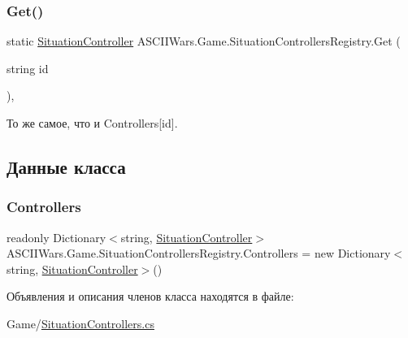 \subsubsection{\texorpdfstring{Get()}{Get()}}
{\footnotesize\ttfamily static \hyperlink{interface_a_s_c_i_i_wars_1_1_game_1_1_situation_controller}{Situation\+Controller} A\+S\+C\+I\+I\+Wars.\+Game.\+Situation\+Controllers\+Registry.\+Get (\begin{DoxyParamCaption}\item[{string}]{id }\end{DoxyParamCaption})\hspace{0.3cm}{\ttfamily [inline]}, {\ttfamily [static]}}



То же самое, что и {\ttfamily Controllers\mbox{[}id\mbox{]}}. 



\subsection{Данные класса}
\hypertarget{class_a_s_c_i_i_wars_1_1_game_1_1_situation_controllers_registry_a1fbefd2e6e4140f5d703ffb7367fee20}{}\label{class_a_s_c_i_i_wars_1_1_game_1_1_situation_controllers_registry_a1fbefd2e6e4140f5d703ffb7367fee20} 
\subsubsection{\texorpdfstring{Controllers}{Controllers}}
{\footnotesize\ttfamily readonly Dictionary$<$string, \hyperlink{interface_a_s_c_i_i_wars_1_1_game_1_1_situation_controller}{Situation\+Controller}$>$ A\+S\+C\+I\+I\+Wars.\+Game.\+Situation\+Controllers\+Registry.\+Controllers = new Dictionary$<$string, \hyperlink{interface_a_s_c_i_i_wars_1_1_game_1_1_situation_controller}{Situation\+Controller}$>$()\hspace{0.3cm}{\ttfamily [static]}}



Объявления и описания членов класса находятся в файле\+:\begin{DoxyCompactItemize}
\item 
Game/\hyperlink{_situation_controllers_8cs}{Situation\+Controllers.\+cs}\end{DoxyCompactItemize}
